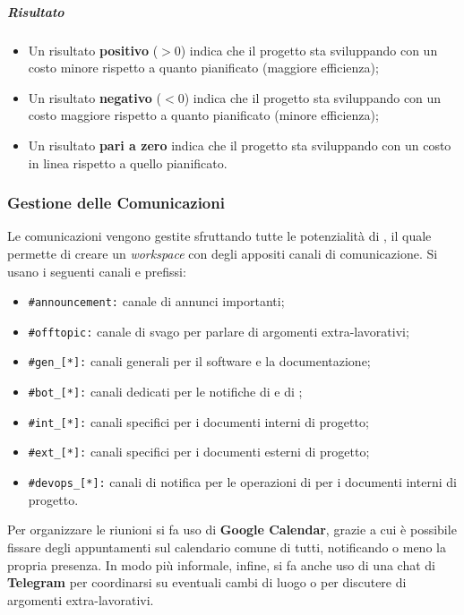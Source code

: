 				\subparagraph{Risultato}
				\begin{itemize}
					\item Un risultato \textbf{positivo} (\(> 0\)) indica che il progetto sta sviluppando con un costo minore rispetto a quanto pianificato (maggiore efficienza);
					\item Un risultato \textbf{negativo} (\(< 0\)) indica che il progetto sta sviluppando con un costo maggiore rispetto a quanto pianificato (minore efficienza);
					\item Un risultato \textbf{pari a zero} indica che il progetto sta sviluppando con un costo in linea rispetto a quello pianificato.
				\end{itemize}


		\subsubsection{Gestione delle Comunicazioni}

      Le comunicazioni vengono gestite sfruttando tutte le potenzialità di , il quale permette di creare un \textit{workspace} con degli appositi canali di comunicazione. Si usano i seguenti canali e prefissi:
      \begin{itemize}
        \item \verb!#announcement:! canale di annunci importanti;
        \item \verb!#offtopic:! canale di svago per parlare di argomenti extra-lavorativi;
        \item \verb!#gen_[*]:! canali generali per il software e la documentazione;
        \item \verb!#bot_[*]:! canali dedicati per le notifiche di  e di ;
        \item \verb!#int_[*]:! canali specifici per i documenti interni di progetto;
        \item \verb!#ext_[*]:! canali specifici per i documenti esterni di progetto;
        \item \verb!#devops_[*]:! canali di notifica per le operazioni di  per i documenti interni di progetto.
      \end{itemize}

      Per organizzare le riunioni si fa uso di \textbf{Google Calendar}, grazie a cui è possibile fissare degli appuntamenti sul calendario comune di tutti, notificando o meno la propria presenza.
      In modo più informale, infine, si fa anche uso di una chat di \textbf{Telegram} per coordinarsi su eventuali cambi di luogo o per discutere di argomenti extra-lavorativi.

